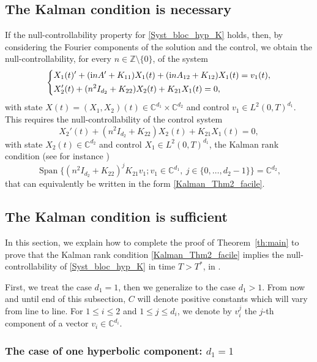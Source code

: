 \documentclass[JEP,XML,SOM,Unicode,NoEqCountersInSection]{cedram}
\theoremstyle{plain}
\theoremstyle{definition}
\theoremstyle{remark}
\DeclareMathOperator{\Span}{Span}
\newcommand{\set}{\mathbb}
\newcommand{\Z}{\set{Z}}
\renewcommand{\C}{\set{C}}
\newcommand{\iu}{\mathrm i}
\let\originalleft\left
\let\originalright\right
\renewcommand{\left}{\mathopen{}\mathclose\bgroup\originalleft}
\renewcommand{\right}{\aftergroup\egroup\originalright}
\begin{document}
\subsection{The Kalman condition is necessary}
\label{SectionRequirementKalman}

If the null-controllability property for \eqref{Syst_bloc_hyp_K} holds, then, by
considering the Fourier components of the solution and the control, we obtain the null-controllability, for every $n\in\Z\setminus\{0\}$, of the system
\[
\left\lbrace\begin{aligned}
& X_1(t)'+ (\iu nA'+K_{11})X_1(t) + (\iu nA_{12}+K_{12})X_1(t) = v_1(t), \\
& X_2'(t)+(n^2 I_{d_2}+K_{22})X_2(t)+ K_{21} X_1(t)=0,
\end{aligned}\right.
\]
with state $X(t)=(X_1,X_2)(t)\in\C^{d_1}\times\C^{d_2}$ and control $v_1 \in L^2(0,T)^{d_1}$. This requires the null-controllability of the control system
\[
X_2'(t)+(n^2 I_{d_2}+ K_{22})X_2(t) + K_{21} X_1(t)=0,
\]
with state $X_2(t) \in \C^{d_2}$ and control $X_1 \in L^2(0,T)^{d_1}$, \ie the Kalman rank condition (see for instance \cite[Th.\,1.16]{coron_2007})
\[
\Span\{ (n^2 I_{d_2}+K_{22})^j K_{21} v_1 ; v_1 \in \C^{d_1},\ j \in \{0,\dots,d_2-1\}\}=\C^{d_2},
\]
that can equivalently be written in the form \eqref{Kalman_Thm2_facile}.

\subsection{The Kalman condition is sufficient}
\label{subsec:K_S_K}

In this section, we explain how to complete the proof of Theorem~\ref{th:main} to prove that the Kalman rank condition \eqref{Kalman_Thm2_facile} implies the null-controllability of \eqref{Syst_bloc_hyp_K} in time $T>T^\ast$, in .

First, we treat the case $d_1 = 1$, then we generalize to the case $d_1 >1$. From now and until end of this subsection, $C$ will denote positive constants which will vary from line to line. For $1 \leq i \leq 2$ and $1 \leq j \leq d_i$, we denote by $v_{i}^j$ the $j$-th component of a vector $v_i \in \C^{d_i}$.

\subsubsection{The case of one hyperbolic component: $d_1 = 1$}
\end{document}

